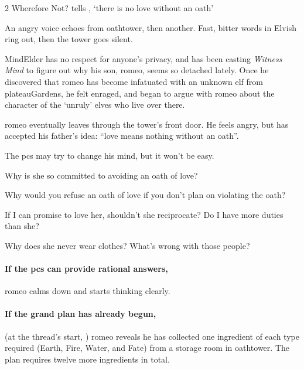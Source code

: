 \begin{multicols}{2}
{Wherefore Not?}%
{ tells , `there is no love without an oath'}%

\begin{boxtext}
  An angry voice echoes from \gls{oathtower}, then another.
  Fast, bitter words in Elvish ring out, then the tower goes silent.
\end{boxtext}

\Gls{MindElder} has no respect for anyone's privacy, and has been \gls{casting} \textit{Witness Mind} to figure out why his son, \gls{romeo}, seems so detached lately.
Once he discovered that \gls{romeo} has become infatuated with an unknown elf from \gls{plateauGardens}, he felt enraged, and began to argue with \gls{romeo} about the character of the `unruly' elves who live over there.

\Gls{romeo} eventually leaves through the tower's front door.
He feels angry, but has accepted his father's idea: ``love means nothing without an oath''.

The \glspl{pc} may try to change his mind, but it won't be easy.

\begin{speechtext}
  Why is she so committed to avoiding an oath of love?

  Why would you refuse an oath of love if you don't plan on violating the oath?

  If I can promise to love her, shouldn't she reciprocate?
  Do I have more duties than she?

  Why does she never wear clothes?
  What's wrong with those people?
\end{speechtext}

\paragraph{If the \glspl{pc} can provide rational answers,}
\gls{romeo} calms down and starts thinking clearly.

\paragraph{If the grand plan has already begun,}
(at the \gls{thread}'s start, )
\Gls{romeo} reveals he has collected one \gls{ingredient} of each type required (Earth, Fire, Water, and Fate) from a storage room in \gls{oathtower}.
The plan requires twelve more \glspl{ingredient} in total.


\end{multicols}
